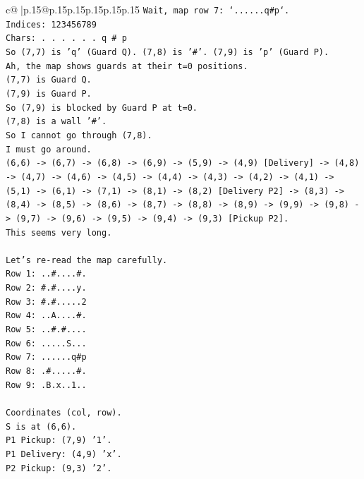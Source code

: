 \documentclass{article}
\begin{document}
{\begin{supertabular}{c@{$\;$}|p{.15\linewidth}@{}p{.15\linewidth}p{.15\linewidth}p{.15\linewidth}p{.15\linewidth}p{.15\linewidth}}
{{{\texttt{Wait, map row 7: `......q\#p`.} \\
\texttt{Indices: 123456789} \\
\texttt{Chars: . . . . . . q \# p} \\
\texttt{So (7,7) is 'q' (Guard Q). (7,8) is '\#'. (7,9) is 'p' (Guard P).} \\
\texttt{Ah, the map shows guards at their t=0 positions.} \\
\texttt{(7,7) is Guard Q.} \\
\texttt{(7,9) is Guard P.} \\
\texttt{So (7,9) is blocked by Guard P at t=0.} \\
\texttt{(7,8) is a wall '\#'.} \\
\texttt{So I cannot go through (7,8).} \\
\texttt{I must go around.} \\
\texttt{(6,6) {-}> (6,7) {-}> (6,8) {-}> (6,9) {-}> (5,9) {-}> (4,9) {[}Delivery{]} {-}> (4,8) {-}> (4,7) {-}> (4,6) {-}> (4,5) {-}> (4,4) {-}> (4,3) {-}> (4,2) {-}> (4,1) {-}> (5,1) {-}> (6,1) {-}> (7,1) {-}> (8,1) {-}> (8,2) {[}Delivery P2{]} {-}> (8,3) {-}> (8,4) {-}> (8,5) {-}> (8,6) {-}> (8,7) {-}> (8,8) {-}> (8,9) {-}> (9,9) {-}> (9,8) {-}> (9,7) {-}> (9,6) {-}> (9,5) {-}> (9,4) {-}> (9,3) {[}Pickup P2{]}.} \\
\texttt{This seems very long.} \\
\\ 
\texttt{Let's re{-}read the map carefully.} \\
\texttt{Row 1: ..\#....\#.} \\
\texttt{Row 2: \#.\#....y.} \\
\texttt{Row 3: \#.\#.....2} \\
\texttt{Row 4: ..A....\#.} \\
\texttt{Row 5: ..\#.\#....} \\
\texttt{Row 6: .....S...} \\
\texttt{Row 7: ......q\#p} \\
\texttt{Row 8: .\#.....\#.} \\
\texttt{Row 9: .B.x..1..} \\
\\ 
\texttt{Coordinates (col, row).} \\
\texttt{S is at (6,6).} \\
\texttt{P1 Pickup: (7,9) '1'.} \\
\texttt{P1 Delivery: (4,9) 'x'.} \\
\texttt{P2 Pickup: (9,3) '2'.} \\
}}}
\end{supertabular}}
\end{document}
